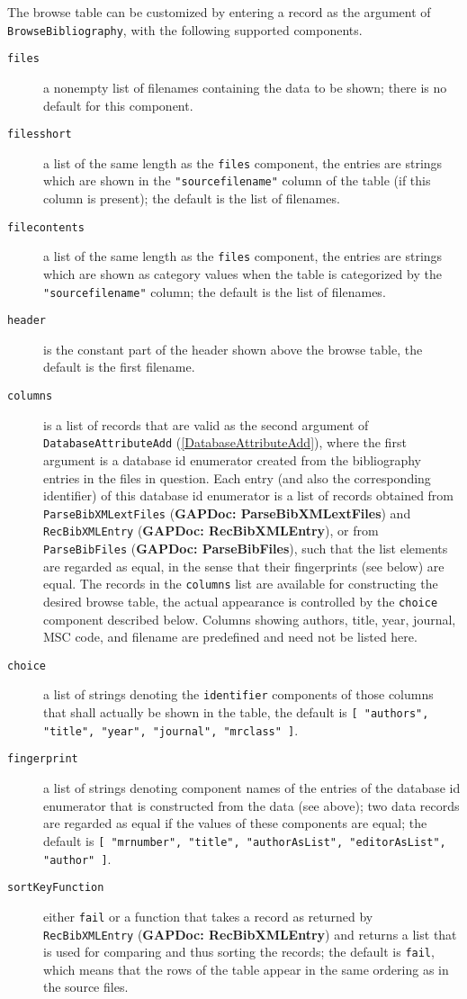 \documentclass[a4paper,11pt]{report}
\begin{document}
{{{ The browse table can be customized by entering a record as the argument of \texttt{BrowseBibliography}, with the following supported components. 
\begin{description}
\item[{\texttt{files}}]  a nonempty list of filenames containing the data to be shown; there is no
default for this component. 
\item[{\texttt{filesshort}}]  a list of the same length as the \texttt{files} component, the entries are strings which are shown in the \texttt{"sourcefilename"} column of the table (if this column is present); the default is the list of
filenames. 
\item[{\texttt{filecontents}}]  a list of the same length as the \texttt{files} component, the entries are strings which are shown as category values when the
table is categorized by the \texttt{"sourcefilename"} column; the default is the list of filenames. 
\item[{\texttt{header}}]  is the constant part of the header shown above the browse table, the default
is the first filename. 
\item[{\texttt{columns}}]  is a list of records that are valid as the second argument of \texttt{DatabaseAttributeAdd} (\ref{DatabaseAttributeAdd}), where the first argument is a database id enumerator created from the
bibliography entries in the files in question. Each entry (and also the
corresponding identifier) of this database id enumerator is a list of records
obtained from \texttt{ParseBibXMLextFiles} (\textbf{GAPDoc: ParseBibXMLextFiles}) and \texttt{RecBibXMLEntry} (\textbf{GAPDoc: RecBibXMLEntry}), or from \texttt{ParseBibFiles} (\textbf{GAPDoc: ParseBibFiles}), such that the list elements are regarded as equal, in the sense that their
fingerprints (see below) are equal. The records in the \texttt{columns} list are available for constructing the desired browse table, the actual
appearance is controlled by the \texttt{choice} component described below. Columns showing authors, title, year, journal, MSC
code, and filename are predefined and need not be listed here. 
\item[{\texttt{choice}}]  a list of strings denoting the \texttt{identifier} components of those columns that shall actually be shown in the table, the
default is \texttt{[ "authors", "title", "year", "journal", "mrclass" ]}. 
\item[{\texttt{fingerprint}}]  a list of strings denoting component names of the entries of the database id
enumerator that is constructed from the data (see above); two data records are
regarded as equal if the values of these components are equal; the default is \texttt{[ "mrnumber", "title", "authorAsList", "editorAsList", "author" ]}. 
\item[{\texttt{sortKeyFunction}}]  either \texttt{fail} or a function that takes a record as returned by \texttt{RecBibXMLEntry} (\textbf{GAPDoc: RecBibXMLEntry}) and returns a list that is used for comparing and thus sorting the records;
the default is \texttt{fail}, which means that the rows of the table appear in the same ordering as in the
source files. 
\end{description}
 }

}}
\end{document}
